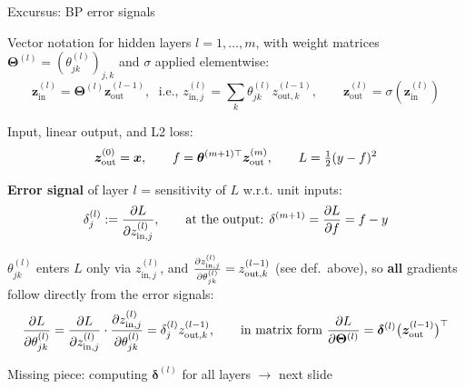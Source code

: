 \documentclass[11pt,compress,t,notes=noshow, xcolor=table]{beamer}
\newcommand{\zin}[2]{z_{\text{in},{#1}}^{(#2)}}
\newcommand{\zout}[2]{z_{\text{out},{#1}}^{(#2)}}
\begin{document}
\begin{framei}[fs=footnotesize]{Excursus: BP error signals}
\item Vector notation for hidden layers $l = 1, \dots, m$, with weight matrices $\bm{\Theta}^{(l)} = (\theta_{jk}^{(l)})_{j,k}$ and $\sigma$ applied elementwise:
$$\bm{z}_{\text{in}}^{(l)} = \bm{\Theta}^{(l)} \bm{z}_{\text{out}}^{(l-1)}, \; \text{ i.e., } \zin{j}{l} = \sum_k \theta_{jk}^{(l)} \zout{k}{l-1}, \qquad
\bm{z}_{\text{out}}^{(l)} = \sigma(\bm{z}_{\text{in}}^{(l)})$$
\item Input, linear output, and L2 loss:
$$\bm{z}_{\text{out}}^{(0)} = \bm{x}, \qquad f = \bm{\theta}^{(m+1) \top} \bm{z}_{\text{out}}^{(m)}, \qquad L = \tfrac{1}{2} (y - f)^2$$
\item \textbf{Error signal} of layer $l$ = sensitivity of $L$ w.r.t. unit inputs:
$$\delta_j^{(l)} := \pd{L}{\zin{j}{l}}, \qquad \text{at the output: } \delta^{(m+1)} = \pd{L}{f} = f - y$$
\item $\theta_{jk}^{(l)}$ enters $L$ only via $\zin{j}{l}$, and $\pd{\zin{j}{l}}{\theta_{jk}^{(l)}} = \zout{k}{l-1}$ (see def.\ above), so \textbf{all} gradients follow directly from the error signals:
$$\pd{L}{\theta_{jk}^{(l)}} = \pd{L}{\zin{j}{l}} \cdot \pd{\zin{j}{l}}{\theta_{jk}^{(l)}} = \delta_j^{(l)} \zout{k}{l-1}, \qquad \text{in matrix form } \pd{L}{\bm{\Theta}^{(l)}} = \bm{\delta}^{(l)} \big( \bm{z}_{\text{out}}^{(l-1)} \big)^\top$$
\item Missing piece: computing $\bm{\delta}^{(l)}$ for all layers $\to$ next slide
\end{framei}
\end{document}
